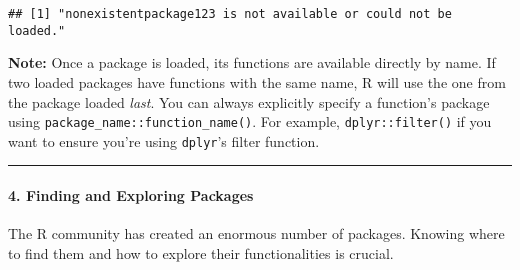 \documentclass[
]{article}
\begin{document}
\begin{verbatim}
## [1] "nonexistentpackage123 is not available or could not be loaded."
\end{verbatim}

\textbf{Note:} Once a package is loaded, its functions are available
directly by name. If two loaded packages have functions with the same
name, R will use the one from the package loaded \emph{last}. You can
always explicitly specify a function's package using
\texttt{package\_name::function\_name()}. For example,
\texttt{dplyr::filter()} if you want to ensure you're using
\texttt{dplyr}'s filter function.

\begin{center}\rule{0.5\linewidth}{0.5pt}\end{center}

\paragraph{\texorpdfstring{\textbf{4. Finding and Exploring
Packages}}{4. Finding and Exploring Packages}}\label{finding-and-exploring-packages}

The R community has created an enormous number of packages. Knowing
where to find them and how to explore their functionalities is crucial.
\end{document}

